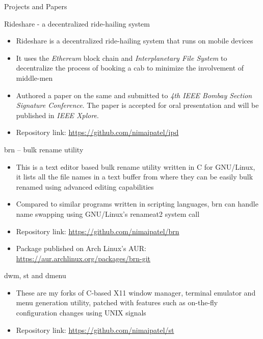 \documentclass{article}
\newlength{\tabin}
\newlength{\secsep}
\newcommand{\lineunder}{\vspace*{-8pt} \\ \hspace*{-6pt} \hrulefill \\ \vspace*{-15pt}}
\newenvironment{tabbedsection}[1]{
	\begin{list}{}{
		\setlength{\itemsep}{0pt}
		\setlength{\labelsep}{0pt}
		\setlength{\labelwidth}{0pt}
		\setlength{\leftmargin}{\tabin}
		\setlength{\rightmargin}{\tabin}
		\setlength{\listparindent}{0pt}
		\setlength{\parsep}{0pt}
		\setlength{\parskip}{0pt}
		\setlength{\partopsep}{0pt}
		\setlength{\topsep}{#1}
	}
	\item[]
}{\end{list}}
\newenvironment{resume_section}[1]{
	\vspace{2\secsep}
	\textsc{\large#1}
	\lineunder
	\begin{tabbedsection}{\secsep}
}{\end{tabbedsection}}
\newenvironment{resume_subsection}[2][]{
	\textbf{#2} \hfill {\footnotesize #1} \hspace{2em}
	\begin{tabbedsection}{0.5\secsep}
}{\end{tabbedsection}}
\newenvironment{subitems}{
	\renewcommand{\labelitemi}{-}
	\begin{itemize}
		\setlength{\labelsep}{1em}
}{\end{itemize}}
\begin{document}
\begin{resume_section}{Projects and Papers}

	\begin{resume_subsection}{Rideshare - a decentralized ride-hailing system}
		\begin{subitems}
			\item Rideshare is a decentralized ride-hailing system
				that runs on mobile devices
			\item It uses the \textit{Ethereum} block chain and
				\textit{Interplanetary File System} to
				decentralize the process of booking a cab to
				minimize the involvement of middle-men
			\item Authored a paper on the same and submitted to
				\textit{4th IEEE Bombay Section Signature
				Conference}. The paper is accepted for oral
				presentation and will be published in
				\textit{IEEE Xplore}.
			\item Repository link:
				\href{https://github.com/nimaipatel/ipd}{https://github.com/nimaipatel/ipd}
		\end{subitems}
	\end{resume_subsection}

	\begin{resume_subsection}{brn -- bulk rename utility}
		\begin{subitems}
			\item This is a text editor based bulk rename utility
				written in C for GNU/Linux, it lists all the
				file names in a text buffer from where they can
				be easily bulk renamed using advanced editing
				capabilities
			\item Compared to similar programs written in scripting
				languages, brn can handle name swapping using
				GNU/Linux's renameat2 system call
			\item Repository link: \href{https://github.com/nimaipatel/brn}{https://github.com/nimaipatel/brn}
			\item Package published on Arch Linux's AUR: \href{https://aur.archlinux.org/packages/brn-git}{https://aur.archlinux.org/packages/brn-git}
		\end{subitems}
	\end{resume_subsection}

	\begin{resume_subsection}{dwm, st and dmenu}
		\begin{subitems}
			\item These are my forks of C-based X11 window manager, terminal emulator and menu generation utility, patched with features such as on-the-fly configuration changes using UNIX signals
			\item Repository link: \href{https://github.com/nimaipatel/st}{https://github.com/nimaipatel/st}
		\end{subitems}
	\end{resume_subsection}



\end{resume_section}
\end{document}
